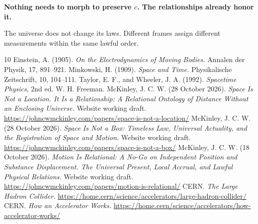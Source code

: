 \documentclass[11pt]{article}
\begin{document}
\textbf{Nothing needs to morph to preserve $c$. The relationships already honor it.}

The universe does not change its laws. Different frames assign different measurements within the same lawful order.

\begin{thebibliography}{10}
 Einstein, A. (1905). \emph{On the Electrodynamics of Moving Bodies.} Annalen der Physik, 17, 891--921.
 Minkowski, H. (1909). \emph{Space and Time.} Physikalische Zeitschrift, 10, 104--111.
 Taylor, E. F., and Wheeler, J. A. (1992). \emph{Spacetime Physics}, 2nd ed. W. H. Freeman.
 McKinley, J. C. W. (28 October 2026). \emph{Space Is Not a Location. It Is a Relationship: A Relational Ontology of Distance Without an Enclosing Universe.} Website working draft. \url{https://johncwmckinley.com/papers/space-is-not-a-location/}
 McKinley, J. C. W. (28 October 2026). \emph{Space Is Not a Box: Timeless Law, Universal Actuality, and the Registration of Space and Motion.} Website working draft. \url{https://johncwmckinley.com/papers/space-is-not-a-box/}
 McKinley, J. C. W. (18 October 2026). \emph{Motion Is Relational: A No-Go on Independent Position and Substance Displacement. The Universal Present, Local Accrual, and Lawful Physical Relations.} Website working draft. \url{https://johncwmckinley.com/papers/motion-is-relational/}
 CERN. \emph{The Large Hadron Collider.} \url{https://home.cern/science/accelerators/large-hadron-collider/}
 CERN. \emph{How an Accelerator Works.} \url{https://home.cern/science/accelerators/how-accelerator-works/}
\end{thebibliography}
\end{document}

